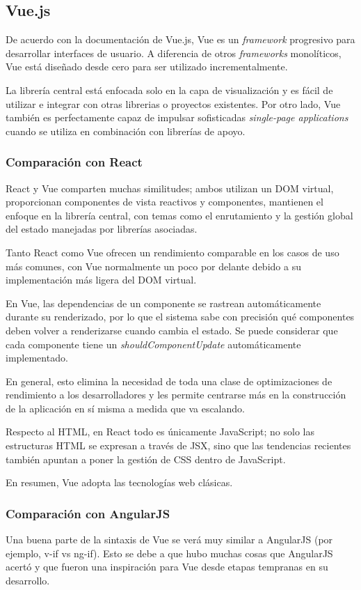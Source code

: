 \subsection*{Vue.js}
De acuerdo con la documentación de Vue.js\cite{noauthor_que_nodate}, Vue es un \textit{framework} progresivo para desarrollar interfaces de usuario. A diferencia de otros \textit{frameworks} monolíticos, Vue está diseñado desde cero para ser utilizado incrementalmente.


La librería central está enfocada solo en la capa de visualización y es fácil de utilizar e integrar con otras librerias o proyectos existentes. Por otro lado, Vue también es perfectamente capaz de impulsar sofisticadas \textit{single-page applications} cuando se utiliza en combinación con librerías de apoyo.


\subsubsection*{Comparación con React}

React y Vue comparten muchas similitudes; ambos utilizan un DOM virtual, proporcionan componentes de vista reactivos y componentes, mantienen el enfoque en la librería central, con temas como el enrutamiento y la gestión global del estado manejadas por librerías asociadas.


Tanto React como Vue ofrecen un rendimiento comparable en los casos de uso más comunes, con Vue normalmente un poco por delante debido a su implementación más ligera del DOM virtual.


En Vue, las dependencias de un componente se rastrean automáticamente durante su renderizado, por lo que el sistema sabe con precisión qué componentes deben volver a renderizarse cuando cambia el estado. Se puede considerar que cada componente tiene un \textit{shouldComponentUpdate} automáticamente implementado.


En general, esto elimina la necesidad de toda una clase de optimizaciones de rendimiento a los desarrolladores y les permite centrarse más en la construcción de la aplicación en sí misma a medida que va escalando.


Respecto al HTML, en React todo es únicamente JavaScript; no solo las estructuras HTML se expresan a través de JSX, sino que las tendencias recientes también apuntan a poner la gestión de CSS dentro de JavaScript.


En resumen, Vue adopta las tecnologías web clásicas.


\subsubsection*{Comparación con AngularJS}
Una buena parte de la sintaxis de Vue se verá muy similar a AngularJS (por ejemplo, v-if vs ng-if). Esto se debe a que hubo muchas cosas que AngularJS acertó y que fueron una inspiración para Vue desde etapas tempranas en su desarrollo.



